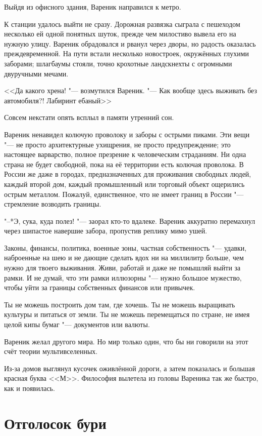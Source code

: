 Выйдя из офисного здания, Вареник направился к метро.

К станции удалось выйти не сразу.
Дорожная развязка сыграла с пешеходом несколько ей одной понятных шуток, прежде чем милостиво вывела его на нужную улицу.
Вареник обрадовался и рванул через дворы, но радость оказалась преждевременной.
На пути встали несколько новостроек, окружённых глухими заборами;
шлагбаумы стояли, точно крохотные ландскнехты с огромными двуручными мечами.

<<Да какого хрена! "--- возмутился Вареник.
"--- Как вообще здесь выживать без автомобиля?!
Лабиринт ебаный\ldotst >>

Совсем некстати опять всплыл в памяти утренний сон.

Вареник ненавидел колючую проволоку и заборы с острыми пиками.
Эти вещи "--- не просто архитектурные ухищрения, не просто предупреждение;
это настоящее варварство, полное презрение к человеческим страданиям.
Ни одна страна не будет свободной, пока на её территории есть колючая проволока.
В России же даже в городах, предназначенных для проживания свободных людей, каждый второй дом, каждый промышленный или торговый объект ощерились острым металлом.
Пожалуй, единственное, что не имеет границ в России "--- стремление возводить границы.

"--*Э, сука, куда полез! "--- заорал кто-то вдалеке.
Вареник аккуратно перемахнул через шипастое навершие забора, пропустив реплику мимо ушей.

Законы, финансы, политика, военные зоны, частная собственность "--- удавки, наброенные на шею и не дающие сделать вдох ни на миллилитр больше, чем нужно для твоего выживания.
Живи, работай и даже не помышляй выйти за рамки.
И не думай, что эти рамки иллюзорны "--- нужно большое мужество, чтобы уйти за границы собственных финансов или привычек.

Ты не можешь построить дом там, где хочешь.
Ты не можешь выращивать культуры и питаться от земли.
Ты не можешь перемещаться по стране, не имея целой кипы бумаг "--- документов или валюты.

Вареник желал другого мира.
Но мир только один, что бы ни говорили на этот счёт теории мультивселенных.

\ldotst Из-за домов выглянул кусочек оживлённой дороги, а затем показалась и большая красная буква <<М>>.
Философия вылетела из головы Вареника так же быстро, как и появилась.

\section{Отголосок бури}

